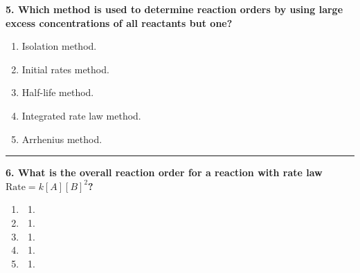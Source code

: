 \documentclass[
  9pt,
]{extbook}
\providecommand{\tightlist}{%
  \setlength{\itemsep}{0pt}\setlength{\parskip}{0pt}}
\theoremstyle{definition}
\theoremstyle{definition}
\theoremstyle{definition}
\theoremstyle{remark}
\begin{document}
\textbf{5. Which method is used to determine reaction orders by using large excess concentrations of all reactants but one?}

\begin{enumerate}
\def\labelenumi{\alph{enumi}.}
\tightlist
\item
  Isolation method.
\item
  Initial rates method.
\item
  Half-life method.
\item
  Integrated rate law method.
\item
  Arrhenius method.
\end{enumerate}

\begin{center}\rule{0.5\linewidth}{0.5pt}\end{center}

\textbf{6. What is the overall reaction order for a reaction with rate law \(\text{Rate} = k[A][B]^2\)?}

\begin{enumerate}
\def\labelenumi{\alph{enumi}.}
\item
  \begin{enumerate}
  \def\labelenumii{\arabic{enumii}.}
  \setcounter{enumii}{2}
  \tightlist
  \item
  \end{enumerate}
\item
  \begin{enumerate}
  \def\labelenumii{\arabic{enumii}.}
  \setcounter{enumii}{1}
  \tightlist
  \item
  \end{enumerate}
\item
  \begin{enumerate}
  \def\labelenumii{\arabic{enumii}.}
  \tightlist
  \item
  \end{enumerate}
\item
  \begin{enumerate}
  \def\labelenumii{\arabic{enumii}.}
  \setcounter{enumii}{-1}
  \tightlist
  \item
  \end{enumerate}
\item
  \begin{enumerate}
  \def\labelenumii{\arabic{enumii}.}
  \setcounter{enumii}{3}
  \tightlist
  \item
  \end{enumerate}
\end{enumerate}
\end{document}

